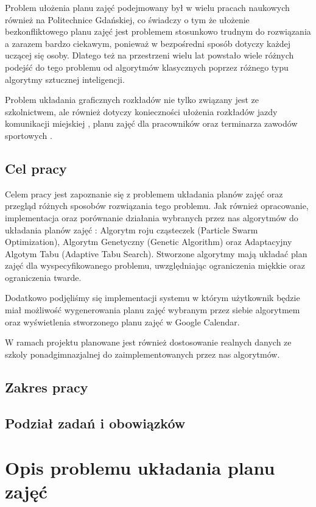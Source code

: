 \documentclass[11pt]{report}
\begin{document}
\par Problem ułożenia planu zajęć podejmowany był w wielu pracach naukowych również na Politechnice Gdańskiej, co świadczy o tym że ułożenie bezkonfliktowego planu zajęć jest problemem stosunkowo trudnym do rozwiązania a zarazem bardzo ciekawym, ponieważ w bezpośredni sposób dotyczy każdej uczącej się osoby. Dlatego też na przestrzeni wielu lat powstało wiele różnych podejść do tego problemu od algorytmów klasycznych poprzez różnego typu algorytmy sztucznej inteligencji.
\par Problem układania graficznych rozkładów nie tylko związany jest ze szkolnictwem, ale również dotyczy konieczności ułożenia rozkładów jazdy komunikacji miejskiej \cite{com}
, planu zajęć dla pracowników \cite{worker} oraz terminarza zawodów sportowych \cite{sport}.
\section{Cel pracy}
\par Celem pracy jest zapoznanie się z problemem układania planów zajęć oraz przegląd różnych sposobów rozwiązania tego problemu. Jak również opracowanie, implementacja oraz porównanie działania wybranych przez nas algorytmów do układania planów zajęć : Algorytm roju cząsteczek (Particle Swarm Optimization), Algorytm Genetyczny (Genetic Algorithm) oraz Adaptacyjny Algotym Tabu (Adaptive Tabu Search). Stworzone algorytmy mają układać plan zajęć dla wyspecyfikowanego problemu, uwzględniając ograniczenia miękkie oraz ograniczenia twarde. 
\par Dodatkowo podjęliśmy się implementacji systemu w którym użytkownik będzie miał możliwość wygenerowania planu zajęć wybranym przez siebie algorytmem oraz wyświetlenia stworzonego planu zajęć w Google Calendar.
\par W ramach projektu planowane jest również dostosowanie realnych danych ze szkoly ponadgimnazjalnej do zaimplementowanych przez nas algorytmów.
\section{Zakres pracy}
\section{Podział zadań i obowiązków}
\chapter{Opis problemu układania planu zajęć}
\end{document}
